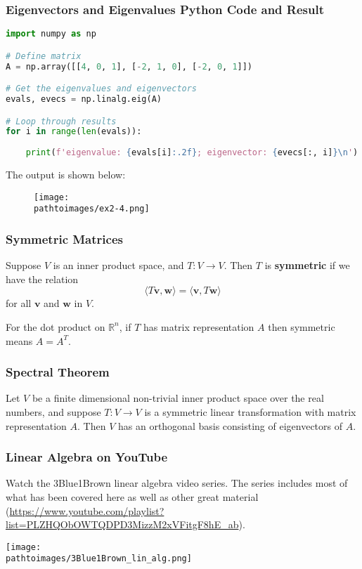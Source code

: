 \documentclass{beamer}
\newcommand{\pathtoimages}{/Users/charlesrambo/Desktop/Bootcamp24/Images}
\begin{document}
\begin{frame}[fragile]
\frametitle{Eigenvectors and Eigenvalues Python Code and Result}

\begin{lstlisting}[language=Python]
import numpy as np

# Define matrix 
A = np.array([[4, 0, 1], [-2, 1, 0], [-2, 0, 1]])

# Get the eigenvalues and eigenvectors
evals, evecs = np.linalg.eig(A)

# Loop through results
for i in range(len(evals)):
    
    print(f'eigenvalue: {evals[i]:.2f}; eigenvector: {evecs[:, i]}\n')
 \end{lstlisting}

The output is shown below:
\begin{figure}
\centering
\texttt{[image: \\pathtoimages/ex2-4.png]}
\end{figure}
\end{frame}

\begin{frame}
\frametitle{Symmetric Matrices}
\begin{Definition}
Suppose $V$ is an inner product space, and $T:V\to V$. Then $T$ is {\bf symmetric} if we have the relation
$$
\langle T{\boldsymbol v}, {\boldsymbol w}\rangle = \langle {\boldsymbol v}, T{\boldsymbol w}\rangle
$$
for all ${\boldsymbol v}$ and ${\boldsymbol w}$ in $V$. 
\end{Definition}
For the dot product on $\mathbb{R}^n$, if $T$ has matrix representation $A$ then symmetric means $A = A^T$.
\end{frame}

\begin{frame}
\frametitle{Spectral Theorem}

\begin{Theorem}
Let $V$ be a finite dimensional non-trivial inner product space over the real numbers, and suppose $T:V\to V$ is a symmetric linear transformation with matrix representation $A$. Then $V$ has an orthogonal basis consisting of eigenvectors of $A$.
\end{Theorem}


\end{frame}

\begin{frame}
\frametitle{Linear Algebra on YouTube}
\small
Watch the 3Blue1Brown linear algebra video series. The series includes most of what has been covered here as well as other great material ({\small \url{https://www.youtube.com/playlist?list=PLZHQObOWTQDPD3MizzM2xVFitgF8hE_ab}}).
\begin{center}
\texttt{[image: \\pathtoimages/3Blue1Brown\_lin\_alg.png]}
\end{center}
\end{frame}
\end{document}
